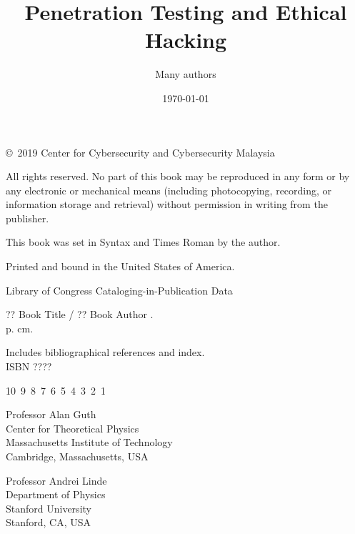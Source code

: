 \documentclass[7x9]{times}
\title{Penetration Testing and Ethical Hacking}
\author{Many authors}
\date{\today}
\begin{document}

\titlepage

\begin{copyrightpage}
	\copyright\ 2019 Center for Cybersecurity and Cybersecurity Malaysia
	
	All rights reserved. No part of this book may be reproduced in
	any form or by any electronic or mechanical means (including
	photocopying, recording, or information storage and retrieval) without
	permission in writing from the publisher.
	
	
	This book was set in Syntax and Times Roman by the author.
	
	Printed and bound in the United States of America.
	
	Library of Congress Cataloging-in-Publication Data
	
	?? Book Title / ?? Book Author .\\
	\hspace*{6pt} p. cm.
	
	Includes bibliographical references and index.\\
	ISBN ???? 
	\vfill
	
	10\ 9\ 8\ 7\ 6\ 5\ 4\ 3\ 2\ 1\
	
\end{copyrightpage}

\tableofcontents
\listoffigures
\listoftables

\begin{contributors}[twocolumn]
	
	\contrib 
	Professor Alan Guth\\
	Center for Theoretical Physics\\
	Massachusetts Institute of Technology\\
	Cambridge, Massachusetts, USA
	
	\contrib 
	Professor Andrei Linde\\
	Department of Physics\\
	Stanford University\\
	Stanford, CA, USA
\end{contributors}
\end{document}
